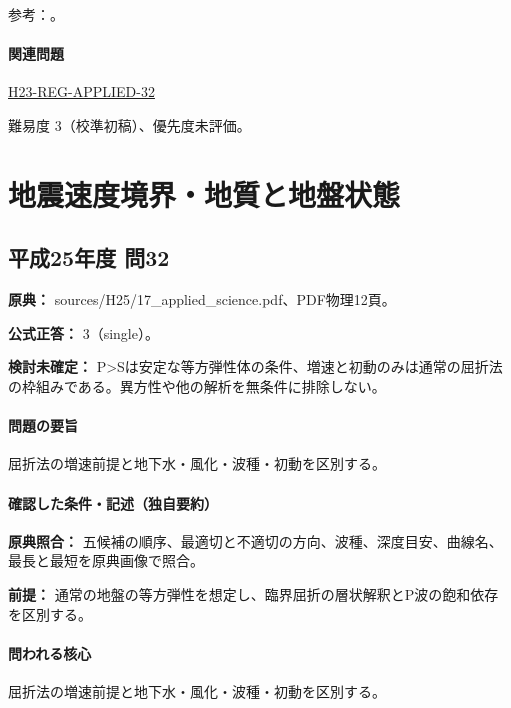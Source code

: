 \par 参考：\cite{jica_refraction2015,usgs_refraction2013,epa_surfacewaves,xia_rayleigh1999,coastal_reflection2016}。

\paragraph{関連問題} \hyperref[q:h23-reg-applied-32]{H23-REG-APPLIED-32}

\par 難易度 3（校準初稿）、優先度未評価。

\section{地震速度境界・地質と地盤状態}

\subsection{平成25年度 問32}
\label{q:h25-reg-applied-32}

\noindent\textbf{原典：} sources/H25/17\_applied\_science.pdf、PDF物理12頁。

\textbf{公式正答：} 3（single）。

\par\textbf{検討未確定：} P>Sは安定な等方弾性体の条件、増速と初動のみは通常の屈折法の枠組みである。異方性や他の解析を無条件に排除しない。

\paragraph{問題の要旨} 屈折法の増速前提と地下水・風化・波種・初動を区別する。

\paragraph{確認した条件・記述（独自要約）}\mbox{}\par

\noindent\textbf{原典照合：} 五候補の順序、最適切と不適切の方向、波種、深度目安、曲線名、最長と最短を原典画像で照合。\par

\noindent\textbf{前提：} 通常の地盤の等方弾性を想定し、臨界屈折の層状解釈とP波の飽和依存を区別する。\par

\paragraph{問われる核心} 屈折法の増速前提と地下水・風化・波種・初動を区別する。

